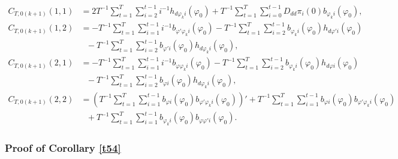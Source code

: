 {{\begin{align*}
     C_{T,0(k+1)}(1,1) &= 2 T^{-1} \sum_{t = 1}^T \sum_{i = 2}^{t-1}  i^{-1} h_{d \varphi_k i}(\varphi_0)  + T^{-1} \sum_{t = 1}^T \sum_{i = 0}^{t-1}  D_{dd} \pi_i(0) b_{\varphi_k i}(\varphi_0),   \\
     C_{T,0(k+1)}(1,2) &= -T^{-1} \sum_{t = 1}^T \sum_{i = 1}^{t-1}  i^{-1} b_{\varphi' \varphi_k i}(\varphi_0) -    T^{-1} \sum_{t = 1}^T \sum_{i = 2}^{t-1}    b_{\varphi_k i}(\varphi_0) h_{d \varphi'  i}(\varphi_0) \\ 
     &\ \ \ -  T^{-1} \sum_{t = 1}^T \sum_{i = 2}^{t-1}   b_{\varphi'  i}(\varphi_0) h_{d \varphi_k  i}(\varphi_0),   \\
     C_{T,0(k+1)}(2,1) &= -T^{-1} \sum_{t = 1}^T \sum_{i = 1}^{t-1}  i^{-1} b_{\varphi \varphi_k i}(\varphi_0) -    T^{-1} \sum_{t = 1}^T \sum_{i = 2}^{t-1}    b_{\varphi_k i}(\varphi_0) h_{d \varphi  i}(\varphi_0) \\
     & \ \ \ -  T^{-1} \sum_{t = 1}^T \sum_{i = 2}^{t-1}    b_{\varphi  i}(\varphi_0) h_{d \varphi_k  i}(\varphi_0),  \\
    C_{T,0(k+1)}(2,2) &= \left( T^{-1} \sum_{t = 1}^T \sum_{i = 1}^{t-1}   b_{\varphi i}(\varphi_0) b_{\varphi' \varphi_k i}(\varphi_0) \right)' + T^{-1} \sum_{t = 1}^T \sum_{i = 1}^{t-1}   b_{\varphi  i}(\varphi_0) b_{\varphi' \varphi_k i}(\varphi_0)  \\
    &\ \ \ + T^{-1} \sum_{t = 1}^T \sum_{i = 1}^{t-1}   b_{\varphi_k i}(\varphi_0) b_{\varphi \varphi' i}(\varphi_0).
\end{align*}


\subsubsection{Proof of Corollary \ref{t54}} \label{proofthm54}


}}

